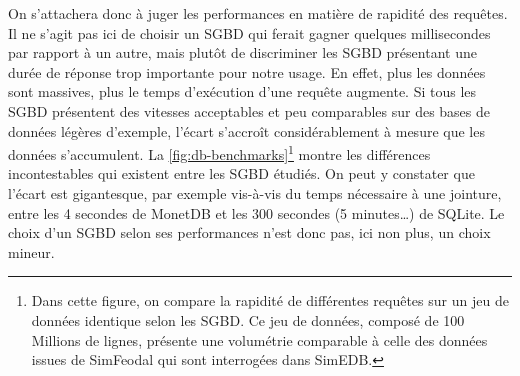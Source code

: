 			On s'attachera donc à juger les performances en matière de rapidité des requêtes.
			Il ne s'agit pas ici de choisir un SGBD qui ferait gagner quelques millisecondes par rapport à un autre, mais plutôt de discriminer les SGBD présentant une durée de réponse trop importante pour notre usage.
			En effet, plus les données sont massives, plus le temps d'exécution d'une requête augmente.
			Si tous les SGBD présentent des vitesses acceptables et peu comparables sur des bases de données légères d'exemple, l'écart s'accroît considérablement à mesure que les données s'accumulent.
			La \cref{fig:db-benchmarks}\footnote{
			Dans cette figure, on compare la rapidité de différentes requêtes sur un jeu de données identique selon les SGBD. Ce jeu de données, composé de 100 Millions de lignes, présente une volumétrie comparable à celle des données issues de SimFeodal qui sont interrogées dans SimEDB.
			} montre les différences incontestables qui existent entre les SGBD étudiés. On peut y constater que l'écart est gigantesque, par exemple vis-à-vis du temps nécessaire à une jointure, entre les 4 secondes de MonetDB et les 300 secondes (5 minutes\ldots) de SQLite.
			Le choix d'un SGBD selon ses performances n'est donc pas, ici non plus, un choix mineur.


